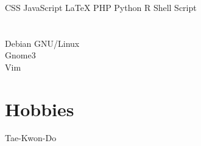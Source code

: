 \documentclass[]{friggeri-cv}
\begin{document}
\newpage
{}%
\begin{aside}
~
~
~
  \section{}
    CSS
    JavaScript
    \LaTeX
    PHP
    Python
    R
    Shell Script
  ~
  \section{}
    Debian GNU/Linux \\%
    Gnome3 \\%
    Vim
  ~
  \section{Hobbies}
      \href{http://olhares.com/diraol}{}
      Tae-Kwon-Do
\end{aside}
\end{document}
